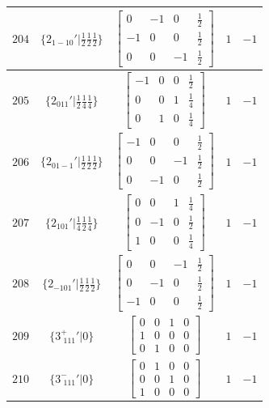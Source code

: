 \documentclass[fleqn,8pt]{jsarticle}
\begin{document}
\begin{longtable}{ccccc}
$ 204 $ & $ \{2{}_{1-10}{}'|\frac{1}{2} \frac{1}{2} \frac{1}{2}\} $ & $ \begin{bmatrix} 0 & -1 & 0 & \frac{1}{2} \\ -1 & 0 & 0 & \frac{1}{2} \\ 0 & 0 & -1 & \frac{1}{2} \end{bmatrix} $ & $ 1 $ & $ -1 $ \\ \hline
$ 205 $ & $ \{2{}_{011}{}'|\frac{1}{2} \frac{1}{4} \frac{1}{4}\} $ & $ \begin{bmatrix} -1 & 0 & 0 & \frac{1}{2} \\ 0 & 0 & 1 & \frac{1}{4} \\ 0 & 1 & 0 & \frac{1}{4} \end{bmatrix} $ & $ 1 $ & $ -1 $ \\ \hline
$ 206 $ & $ \{2{}_{01-1}{}'|\frac{1}{2} \frac{1}{2} \frac{1}{2}\} $ & $ \begin{bmatrix} -1 & 0 & 0 & \frac{1}{2} \\ 0 & 0 & -1 & \frac{1}{2} \\ 0 & -1 & 0 & \frac{1}{2} \end{bmatrix} $ & $ 1 $ & $ -1 $ \\ \hline
$ 207 $ & $ \{2{}_{101}{}'|\frac{1}{4} \frac{1}{2} \frac{1}{4}\} $ & $ \begin{bmatrix} 0 & 0 & 1 & \frac{1}{4} \\ 0 & -1 & 0 & \frac{1}{2} \\ 1 & 0 & 0 & \frac{1}{4} \end{bmatrix} $ & $ 1 $ & $ -1 $ \\ \hline
$ 208 $ & $ \{2{}_{-101}{}'|\frac{1}{2} \frac{1}{2} \frac{1}{2}\} $ & $ \begin{bmatrix} 0 & 0 & -1 & \frac{1}{2} \\ 0 & -1 & 0 & \frac{1}{2} \\ -1 & 0 & 0 & \frac{1}{2} \end{bmatrix} $ & $ 1 $ & $ -1 $ \\ \hline
$ 209 $ & $ \{3^{+}_{\,\,111}{}'|0\} $ & $ \begin{bmatrix} 0 & 0 & 1 & 0 \\ 1 & 0 & 0 & 0 \\ 0 & 1 & 0 & 0 \end{bmatrix} $ & $ 1 $ & $ -1 $ \\ \hline
$ 210 $ & $ \{3^{-}_{\,\,111}{}'|0\} $ & $ \begin{bmatrix} 0 & 1 & 0 & 0 \\ 0 & 0 & 1 & 0 \\ 1 & 0 & 0 & 0 \end{bmatrix} $ & $ 1 $ & $ -1 $ \\ \hline

\end{longtable}
\end{document}
